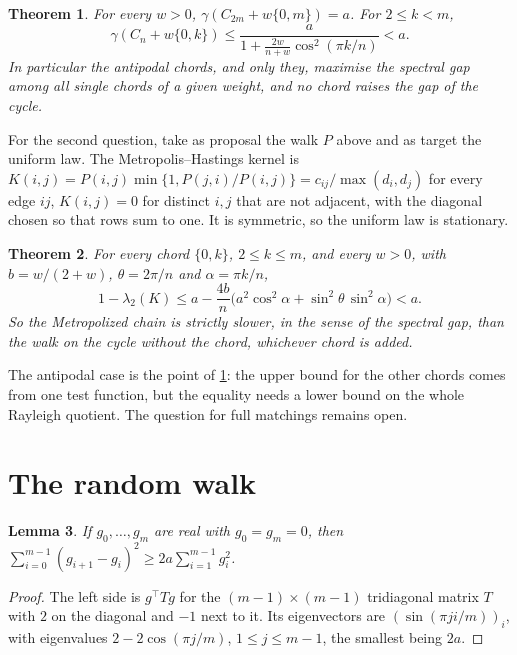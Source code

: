 \documentclass[11pt]{amsart}
\newtheorem{theorem}{Theorem}
\newtheorem{lemma}[theorem]{Lemma}
\theoremstyle{remark}
\begin{document}
\begin{theorem}\label{thm:walk}
For every $w>0$, $\gamma(C_{2m}+w\{0,m\})=a$. For $2\le k<m$,
\begin{equation}\label{eq:strict}
\gamma(C_n+w\{0,k\})\le\frac{a}{1+\frac{2w}{n+w}\cos^2(\pi k/n)}<a .
\end{equation}
In particular the antipodal chords, and only they, maximise the spectral gap among all single chords of a given
weight, and no chord raises the gap of the cycle.
\end{theorem}

For the second question, take as proposal the walk $P$ above and as target the uniform law. The Metropolis--Hastings
kernel is $K(i,j)=P(i,j)\min\{1,P(j,i)/P(i,j)\}=c_{ij}/\max(d_i,d_j)$ for every edge $ij$, $K(i,j)=0$ for distinct
$i,j$ that are not adjacent, with the diagonal chosen so that
rows sum to one. It is symmetric, so the uniform law is stationary.

\begin{theorem}\label{thm:mh}
For every chord $\{0,k\}$, $2\le k\le m$, and every $w>0$, with $b=w/(2+w)$, $\theta=2\pi/n$ and $\alpha=\pi k/n$,
\[
1-\lambda_2(K)\le a-\frac{4b}{n}\bigl(a^2\cos^2\alpha+\sin^2\theta\,\sin^2\alpha\bigr)<a .
\]
So the Metropolized chain is strictly slower, in the sense of the spectral gap, than the walk on the cycle without the
chord, whichever chord is added.
\end{theorem}

The antipodal case is the point of \cref{thm:walk}: the upper bound for the other chords comes from one test function,
but the equality needs a lower bound on the whole Rayleigh quotient. The question for full matchings remains open.

\section{The random walk}

\begin{lemma}\label{lem:path}
If $g_0,\dots,g_m$ are real with $g_0=g_m=0$, then $\sum_{i=0}^{m-1}(g_{i+1}-g_i)^2\ge2a\sum_{i=1}^{m-1}g_i^2$.
\end{lemma}

\begin{proof}
The left side is $g^{\top}Tg$ for the $(m-1)\times(m-1)$ tridiagonal matrix $T$ with $2$ on the diagonal and $-1$ next
to it. Its eigenvectors are $(\sin(\pi ji/m))_i$, with eigenvalues $2-2\cos(\pi j/m)$, $1\le j\le m-1$, the smallest
being $2a$.
\end{proof}
\end{document}
